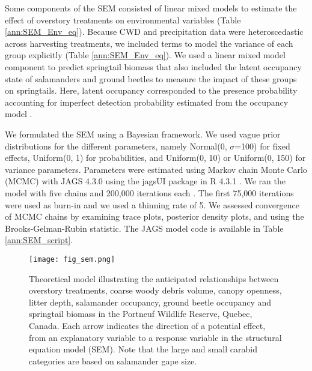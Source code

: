 Some components of the SEM consisted of linear mixed models to estimate the effect of overstory treatments on environmental variables (Table \ref{ann:SEM_Env_eq}). 
Because CWD and precipitation data were heteroscedastic across harvesting treatments, we included terms to model the variance of each group explicitly (Table \ref{ann:SEM_Env_eq}). 
We used a linear mixed model component to predict springtail biomass that also included the latent occupancy state of salamanders and ground beetles to measure the impact of these groups on springtails. 
Here, latent occupancy corresponded to the presence probability accounting for imperfect detection probability estimated from the occupancy model \citep{mackenzieOccupancyEstimationModeling2006a}.

We formulated the SEM using a Bayesian framework. 
We used vague prior distributions for the different parameters, namely Normal(0, $\sigma$=100) for fixed effects, Uniform(0, 1) for probabilities, and Uniform(0, 10) or Uniform(0, 150) for variance parameters. 
Parameters were estimated using Markov chain Monte Carlo (MCMC) with JAGS 4.3.0 using the jagsUI package in R 4.3.1 \citep{lunnBUGSProjectEvolution2009,rcoreteamLanguageEnvironmentStatistical2020,kellnerJagsUIWrapperRjags2024}. 
We ran the model with five chains and 200,000 iterations each \citep{gelmanUnderstandingPredictiveInformation2014}. 
The first 75,000 iterations were used as burn-in and we used a thinning rate of 5. 
We assessed convergence of MCMC chains by examining trace plots, posterior density plots, and using the Brooks-Gelman-Rubin statistic. 
The JAGS model code is available in Table \ref{ann:SEM_script}.

\vspace{10pt}

\begin{figure}[h!]
	\centering
	\texttt{[image: fig\_sem.png]}
	\caption[Theoretical model illustrating the anticipated relationships between overstory treatments, environmental variables and species groups.]
  {Theoretical model illustrating the anticipated relationships between overstory treatments, coarse woody debris volume, canopy openness, litter depth,
   salamander occupancy, ground beetle occupancy and springtail biomass in the Portneuf Wildlife Reserve, Quebec, Canada. 
   Each arrow indicates the direction of a potential effect, from an explanatory variable to a response variable in the structural equation model (SEM). 
   Note that the large and small carabid categories are based on salamander gape size.}
	\label{fig:SEM}
\end{figure} 

